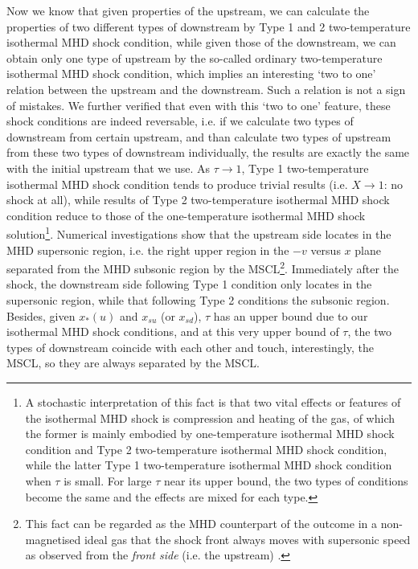 \documentclass[fleqn,usenatbib]{mnras}
\begin{document}
Now we know that given properties of the upstream, we can calculate the properties of two different types of downstream by Type 1 and 2 two-temperature isothermal MHD shock condition, while given those of the downstream, we can obtain only one type of upstream by the so-called ordinary two-temperature isothermal MHD shock condition, which implies an interesting `two to one' relation between the upstream and the downstream. Such a relation is not a sign of mistakes. We further verified that even with this `two to one' feature, these shock conditions are indeed reversable, i.e. if we calculate two types of downstream from certain upstream, and than calculate two types of upstream from these two types of downstream individually, the results are exactly the same with the initial upstream that we use. As $\tau\rightarrow 1$, Type 1 two-temperature isothermal MHD shock condition tends to produce trivial results (i.e. $X\rightarrow 1$: no shock at all), while results of Type 2 two-temperature isothermal MHD shock condition reduce to those of the one-temperature isothermal MHD shock solution\footnote{A stochastic interpretation %
of this fact is that two vital effects or features of the isothermal MHD shock is compression and heating of the gas, of which the former is mainly embodied by one-temperature isothermal MHD shock condition and Type 2 two-temperature isothermal MHD shock condition, while the latter Type 1 two-temperature isothermal MHD shock condition when $\tau$ is small. For large $\tau$ near its upper bound, the two types of conditions become the same and the effects are mixed for each type.}. Numerical investigations show that the upstream side locates in the MHD supersonic region, i.e. the right upper region in the $-v$ versus $x$ plane separated from the MHD subsonic region by the MSCL\footnote{This fact can be regarded as the MHD counterpart of the outcome in a non-magnetised ideal gas that the shock front always moves with supersonic speed as observed from the \textit{front side} (i.e. the upstream) \citep{SFSW}.}. Immediately after the shock, the downstream side following Type 1 condition only locates in the supersonic region, while that following Type 2 conditions the subsonic region. Besides, given $x_{*}(u)$ and $x_{su}$ (or $x_{sd}$), $\tau$ has an upper bound due to our isothermal MHD shock conditions, and at this very upper bound of $\tau$, the two types of downstream coincide with each other and touch, interestingly, the MSCL, so they are always separated by the MSCL.
\end{document}
